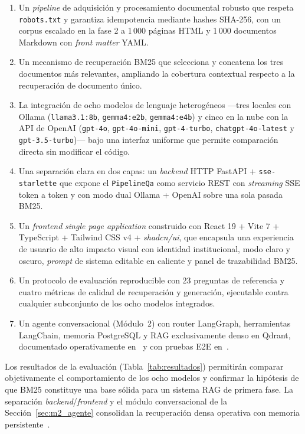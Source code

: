 \documentclass[conference]{IEEEtran}
\newcommand{\code}[1]{\texttt{\small #1}}
\begin{document}
\begin{enumerate}
    \item Un \textit{pipeline} de adquisición y procesamiento documental
          robusto que respeta \code{robots.txt} y garantiza idempotencia
          mediante hashes SHA-256, con un corpus escalado en la fase 2 a
          1\,000 páginas HTML y 1\,000 documentos Markdown con
          \textit{front matter} YAML.
    \item Un mecanismo de recuperación BM25 que selecciona y concatena los
          tres documentos más relevantes, ampliando la cobertura contextual
          respecto a la recuperación de documento único.
    \item La integración de ocho modelos de lenguaje heterogéneos —tres
          locales con Ollama (\code{llama3.1:8b}, \code{gemma4:e2b},
          \code{gemma4:e4b}) y cinco en la nube con la API de OpenAI
          (\code{gpt-4o}, \code{gpt-4o-mini}, \code{gpt-4-turbo},
          \code{chatgpt-4o-latest} y \code{gpt-3.5-turbo})— bajo una
          interfaz uniforme que permite comparación directa sin modificar
          el código.
    \item Una separación clara en dos capas: un \textit{backend} HTTP
          FastAPI + \code{sse-starlette} que expone el \code{PipelineQa}
          como servicio REST con \textit{streaming} SSE token a token y
          con modo dual Ollama + OpenAI sobre una sola pasada BM25.
    \item Un \textit{frontend} \textit{single page application} construido
          con React 19 + Vite 7 + TypeScript + Tailwind CSS v4 +
          \textit{shadcn/ui}, que encapsula una experiencia de usuario de
          alto impacto visual con identidad institucional, modo claro y
          oscuro, \textit{prompt} de sistema editable en caliente y panel
          de trazabilidad BM25.
    \item Un protocolo de evaluación reproducible con 23 preguntas de
          referencia y cuatro métricas de calidad de recuperación y
          generación, ejecutable contra cualquier subconjunto de los ocho
          modelos integrados.
    \item Un agente conversacional (Módulo~2) con router LangGraph,
          herramientas LangChain, memoria PostgreSQL y RAG exclusivamente
          denso en Qdrant, documentado operativamente en~\cite{doc003m2}
          y con pruebas E2E en~\cite{e2em2tests}.
\end{enumerate}

Los resultados de la evaluación (Tabla~\ref{tab:resultados}) permitirán
comparar objetivamente el comportamiento de los ocho modelos y confirmar la
hipótesis de que BM25 constituye una base sólida para un sistema RAG de
primera fase. La separación \textit{backend}/\textit{frontend} y el módulo
conversacional de la Sección~\ref{sec:m2_agente} consolidan la recuperación
densa operativa con memoria persistente~\cite{decision3m2,doc003m2}.
\end{document}
